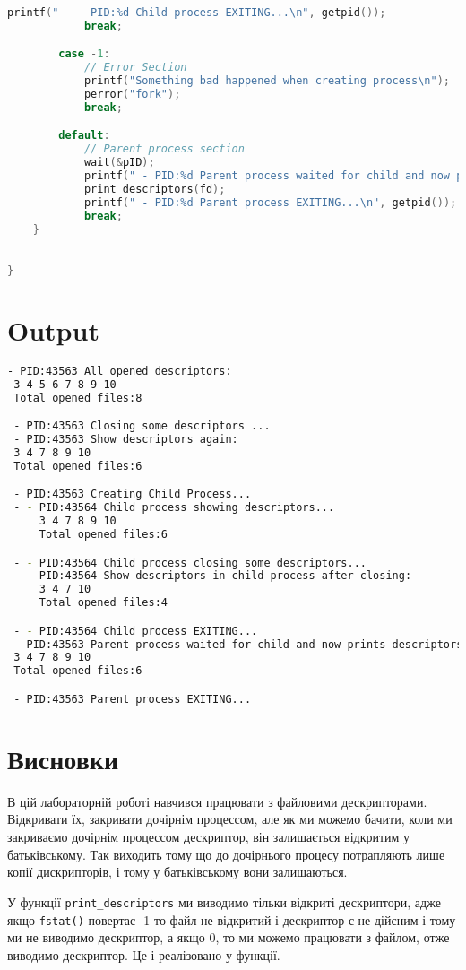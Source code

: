 \documentclass{article}
\begin{document}
\begin{lstlisting}[language=C++]
            printf(" - - PID:%d Child process EXITING...\n", getpid());
            break;

        case -1:
            // Error Section
            printf("Something bad happened when creating process\n");
            perror("fork");
            break;

        default:
            // Parent process section
            wait(&pID);
            printf(" - PID:%d Parent process waited for child and now prints descriptors again\n", getpid());
            print_descriptors(fd);
            printf(" - PID:%d Parent process EXITING...\n", getpid());
            break;
    }
    

}
\end{lstlisting}
\newpage
\section*{Output}
\begin{lstlisting}[language=BASH]
 - PID:43563 All opened descriptors:
 3 4 5 6 7 8 9 10 
 Total opened files:8

 - PID:43563 Closing some descriptors ... 
 - PID:43563 Show descriptors again:
 3 4 7 8 9 10 
 Total opened files:6

 - PID:43563 Creating Child Process...
 - - PID:43564 Child process showing descriptors...
     3 4 7 8 9 10 
     Total opened files:6

 - - PID:43564 Child process closing some descriptors...
 - - PID:43564 Show descriptors in child process after closing:
     3 4 7 10 
     Total opened files:4

 - - PID:43564 Child process EXITING...
 - PID:43563 Parent process waited for child and now prints descriptors again
 3 4 7 8 9 10 
 Total opened files:6

 - PID:43563 Parent process EXITING...

\end{lstlisting}
\newpage
\section*{Висновки}
В цій лабораторній роботі навчився працювати з файловими дескрипторами. Відкривати їх, закривати дочірнім процессом, але як ми можемо бачити, коли ми закриваємо дочірнім процессом дескриптор, він залишається відкритим у батьківському. Так виходить тому що до дочірнього процесу потрапляють лише копії дискрипторів, і тому у батьківському вони залишаються.


У функції \verb|print_descriptors| ми виводимо тільки відкриті дескриптори, адже якщо \verb|fstat()| повертає -1 то файл не відкритий і дескриптор є не дійсним і тому ми не виводимо дескриптор, а якщо 0, то ми можемо працювати з файлом, отже виводимо дескриптор. Це і реалізовано у функції.
\end{document}
